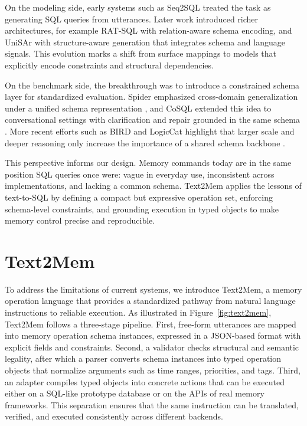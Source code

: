 \documentclass[conference]{IEEEtran}
\begin{document}
On the modeling side, early systems such as Seq2SQL \cite{Zhong2017Seq2SQL} treated the task as generating SQL queries from utterances. Later work introduced richer architectures, for example RAT-SQL \cite{Wang2020RATSQL} with relation-aware schema encoding, and UniSAr \cite{dou2022UniSAr} with structure-aware generation that integrates schema and language signals. This evolution marks a shift from surface mappings to models that explicitly encode constraints and structural dependencies.  

On the benchmark side, the breakthrough was to introduce a constrained schema layer for standardized evaluation. Spider emphasized cross-domain generalization under a unified schema representation \cite{Yu2018Spider}, and CoSQL extended this idea to conversational settings with clarification and repair grounded in the same schema \cite{Yu2019CoSQL}. More recent efforts such as BIRD and LogicCat highlight that larger scale and deeper reasoning only increase the importance of a shared schema backbone \cite{li2024bird,liu2025LogicCat}.  

This perspective informs our design. Memory commands today are in the same position SQL queries once were: vague in everyday use, inconsistent across implementations, and lacking a common schema. Text2Mem applies the lessons of text-to-SQL by defining a compact but expressive operation set, enforcing schema-level constraints, and grounding execution in typed objects to make memory control precise and reproducible.  

\section{Text2Mem}
\label{sec:text2mem} 

To address the limitations of current systems, we introduce Text2Mem, a memory operation language that provides a standardized pathway from natural language instructions to reliable execution. As illustrated in Figure~\ref{fig:text2mem}, Text2Mem follows a three-stage pipeline. First, free-form utterances are mapped into memory operation schema instances, expressed in a JSON-based format with explicit fields and constraints. Second, a validator checks structural and semantic legality, after which a parser converts schema instances into typed operation objects that normalize arguments such as time ranges, priorities, and tags. Third, an adapter compiles typed objects into concrete actions that can be executed either on a SQL-like prototype database or on the APIs of real memory frameworks. This separation ensures that the same instruction can be translated, verified, and executed consistently across different backends.
\end{document}
